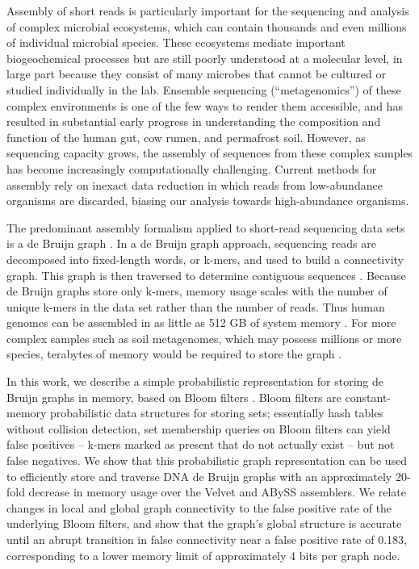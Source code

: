 \documentclass{pnastwo}
\begin{document}
\begin{article}
Assembly of short reads is particularly important for the sequencing
and analysis of complex microbial ecosystems, which can contain
thousands and even millions of individual microbial species.  These
ecosystems mediate important biogeochemical processes but are still
poorly understood at a molecular level, in large part because they
consist of many microbes that cannot be cultured or studied
individually in the lab.  Ensemble sequencing (``metagenomics'') of
these complex environments is one of the few ways to render them
accessible, and has resulted in substantial early progress in
understanding the composition and function of the human gut, cow
rumen, and permafrost soil.  However, as sequencing capacity grows,
the assembly of sequences from these complex samples has become
increasingly computationally challenging.  Current methods for assembly rely on
inexact data reduction in which reads from low-abundance organisms are
discarded, biasing our analysis towards high-abundance organisms.


The predominant assembly formalism applied to short-read sequencing
data sets is a de Bruijn graph \cite{pubmed20211242,pubmed22068540}.
In a de Bruijn graph approach, sequencing reads are decomposed into
fixed-length words, or k-mers, and used to build a connectivity graph.
This graph is then traversed to determine contiguous sequences
\cite{pubmed22068540}.  Because de Bruijn graphs store only k-mers,
memory usage scales with the number of unique k-mers in the data set
rather than the number of reads.  Thus human genomes can be assembled
in as little as 512 GB of system memory \cite{pmid21187386}.  For more
complex samples such as soil metagenomes, which may possess millions
or more species, terabytes of memory would be required to store the graph
\cite{pubmed21304727}.

In this work, we describe a simple probabilistic representation for
storing de Bruijn graphs in memory, based on Bloom filters
\cite{bloom}.  Bloom filters are constant-memory probabilistic data
structures for storing sets; essentially hash tables without collision
detection, set membership queries on Bloom filters can yield false
positives -- k-mers marked as present that do not actually exist --
but not false negatives.  We show that this probabilistic graph
representation can be used to efficiently store and traverse DNA de
Bruijn graphs with an approximately 20-fold decrease in memory usage
over the Velvet and ABySS assemblers. We relate changes in local and
global graph connectivity to the false positive rate of the underlying
Bloom filters, and show that the graph's global structure is accurate
until an abrupt transition in false connectivity near a false positive
rate of 0.183, corresponding to a lower memory limit of approximately
4 bits per graph node.


\end{article}
\end{document}
